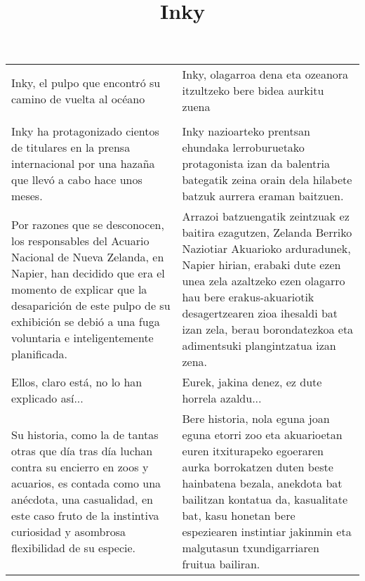 \documentclass{article}
\title{Inky}
\author{}
\date{}
\begin{document}
\maketitle


\begin{center}
\begin{longtable}{|p{6cm}|p{6cm}|}
  \toprule
  \cellcolor{lightgray}{\textbf{Título}} &
  \cellcolor{lightgray}{\textbf{Izenburua}}\\
  
  \midrule
  Inky, el pulpo que encontró su camino de vuelta al océano&
  Inky, olagarroa dena eta ozeanora itzultzeko bere bidea aurkitu zuena\\

  \midrule
  \cellcolor{lightgray}{\textbf{Párrafo}} &
  \cellcolor{lightgray}{\textbf{Paragrafoa}}\\
  
  \midrule
  Inky ha protagonizado cientos de titulares en la prensa internacional por una hazaña que llevó a cabo hace unos meses.&
  Inky nazioarteko prentsan ehundaka lerroburuetako protagonista izan da balentria bategatik zeina orain dela hilabete batzuk aurrera eraman baitzuen.\\

  \midrule
  Por razones que se desconocen, los responsables del Acuario Nacional de Nueva Zelanda, en Napier, han decidido que era el momento de explicar que la desaparición de este pulpo de su exhibición se debió a una fuga voluntaria e inteligentemente planificada.&
  Arrazoi batzuengatik zeintzuak ez baitira ezagutzen, Zelanda Berriko Naziotiar Akuarioko arduradunek, Napier hirian, erabaki dute ezen unea zela azaltzeko ezen olagarro hau bere erakus-akuariotik desagertzearen zioa ihesaldi bat izan zela, berau borondatezkoa eta adimentsuki plangintzatua izan zena.\\

  \midrule
  Ellos, claro está, no lo han explicado así...&
  Eurek, jakina denez, ez dute horrela azaldu...\\

  \midrule
  Su historia, como la de tantas otras que día tras día luchan contra su encierro en zoos y acuarios, es contada como una anécdota, una casualidad, en este caso fruto de la instintiva curiosidad y asombrosa flexibilidad de su especie.&
  Bere historia, nola eguna joan eguna etorri zoo eta akuarioetan euren itxiturapeko egoeraren aurka borrokatzen duten beste hainbatena bezala, anekdota bat bailitzan kontatua da, kasualitate bat, kasu honetan bere espeziearen instintiar jakinmin eta malgutasun txundigarriaren fruitua bailiran.\\


\end{longtable}
\end{center}
\end{document}
